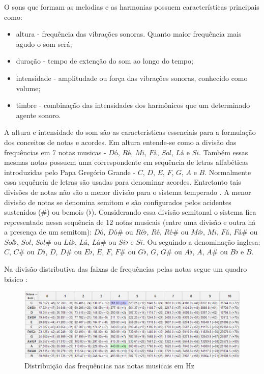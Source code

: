 O sons que formam as melodias e as harmonias possuem características principais como:
\begin{itemize}
	\item altura - frequência das vibrações sonoras. Quanto maior frequência mais agudo o som será;
	\item duração - tempo de extenção do som ao longo do tempo;
	\item intensidade - amplitudade ou força das vibrações sonoras, conhecido como volume;
	\item timbre - combinação das intensidades dos harmônicos que um determinado agente sonoro.
\end{itemize}

A altura e intensidade do som são as características essenciais para a formulação dos conceitos de notas e acordes. Em altura entende-se como a divisão das frequências em 7 notas musicas - $Dó$, $Ré$, $Mi$, $Fá$, $Sol$, $Lá$ e $Si$. Também essas mesmas notas possuem uma correspondente em sequência de letras alfabéticas introduzidas pelo Papa Gregório Grande - $C$, $D$, $E$, $F$, $G$, $A$ e $B$. Normalmente essa sequência de letras são usadas para denominar acordes. Entretanto tais divisões de notas não são a menor divisão para o sistema temperado \cite{med1996teoria}. A menor divisão de notas se denomina semitom e são configurados pelos acidentes sustenidos ($\#$) ou bemois ($\flat$). Considerando essa divisão semitonal o sistema fica representado nessa sequência de 12 notas musicais (entre uma divisão e outra há a presença de um semitom): $Dó$, $Dó\#$ ou $Ré\flat$, $Ré$, $Ré\#$ ou $Mi\flat$, $Mi$, $Fá$, $Fá\#$ ou $Sol\flat$, $Sol$, $Sol\#$ ou $Lá\flat$, $Lá$, $Lá\#$ ou $Si\flat$ e $Si$. Ou seguindo a denominação inglesa: $C$, $C\#$ ou $D\flat$, $D$, $D\#$ ou $E\flat$, $E$, $F$, $F\#$ ou $G\flat$, $G$, $G\#$ ou $A\flat$, $A$, $A\#$ ou $B\flat$ e $B$.

\newpage
Na divisão distributiva das faixas de frequências pelas notas segue um quadro básico \cite{notasfreq}:
\begin{figure}[h]
	\centering
		\includegraphics[scale=0.6]{figuras/NOTASpt.eps}
	\caption{Distribuição das frequências nas notas musicais em Hz}
\end{figure}

